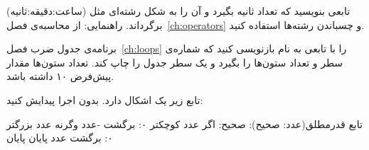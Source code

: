 \exercise تابعی بنویسید که تعداد ثانیه بگیرد و آن را به شکل رشته‌ای مثل
 (ساعت:دقیقه:ثانیه) برگرداند. راهنمایی: از محاسبه‌ی فصل~\ref{ch:operators} و چسباندن رشته‌ها استفاده کنید.

\exercise برنامه‌ی جدول ضرب فصل~\ref{ch:loops} را با تابعی به نام
 بازنویسی کنید که شماره‌ی سطر و تعداد ستون‌ها را بگیرد و
یک سطر جدول را چاپ کند. تعداد ستون‌ها مقدار پیش‌فرض ۱۰ داشته باشد.

\exercise تابع زیر یک اشکال دارد. بدون اجرا پیدایش کنید:
\begin{salamfa}
تابع قدرمطلق(عدد: صحیح): صحیح:
    اگر عدد کوچکتر ۰:
        برگشت -عدد
    وگرنه عدد بزرگتر ۰:
        برگشت عدد
    پایان
پایان
\end{salamfa}
